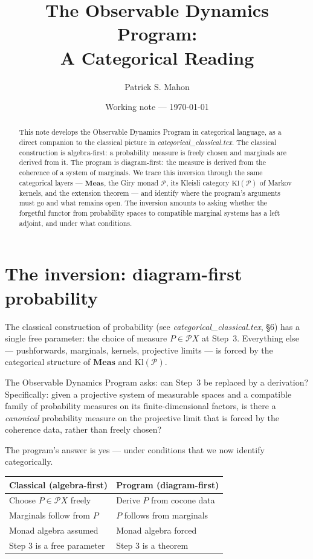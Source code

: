 \documentclass[11pt]{article}
\title{
The Observable Dynamics Program:\\
A Categorical Reading
}
\author{Patrick S. Mahon}
\date{Working note --- \today}
\newcommand{\Meas}{\mathbf{Meas}}
\newcommand{\Kl}{\mathrm{Kl}}
\newcommand{\Pcal}{\mathcal{P}}
\begin{document}
\maketitle

\begin{abstract}
This note develops the Observable Dynamics Program in categorical language,
as a direct companion to the classical picture in \emph{categorical\_classical.tex}.
The classical construction is algebra-first: a probability measure is freely
chosen and marginals are derived from it.  The program is diagram-first: the
measure is derived from the coherence of a system of marginals.  We trace this
inversion through the same categorical layers --- $\Meas$, the Giry monad
$\Pcal$, its Kleisli category $\Kl(\Pcal)$ of Markov kernels, and the
extension theorem --- and identify where the program's arguments must go and
what remains open.  The inversion amounts to asking whether the forgetful
functor from probability spaces to compatible marginal systems has a left
adjoint, and under what conditions.
\end{abstract}

\tableofcontents

\section{The inversion: diagram-first probability}

The classical construction of probability (see \emph{categorical\_classical.tex},
\S6) has a single free parameter: the choice of measure $P \in \Pcal X$ at
Step~3.  Everything else --- pushforwards, marginals, kernels, projective
limits --- is forced by the categorical structure of $\Meas$ and $\Kl(\Pcal)$.

The Observable Dynamics Program asks: can Step~3 be replaced by a derivation?
Specifically: given a projective system of measurable spaces and a compatible
family of probability measures on its finite-dimensional factors, is there a
\emph{canonical} probability measure on the projective limit that is forced
by the coherence data, rather than freely chosen?

The program's answer is yes --- under conditions that we now identify
categorically.

\begin{center}
\begin{tabular}{ll}
\hline
\textbf{Classical (algebra-first)} & \textbf{Program (diagram-first)} \\
\hline
Choose $P \in \Pcal X$ freely & Derive $P$ from cocone data \\
Marginals follow from $P$ & $P$ follows from marginals \\
Monad algebra assumed & Monad algebra forced \\
Step 3 is a free parameter & Step 3 is a theorem \\
\hline
\end{tabular}
\end{center}
\end{document}
